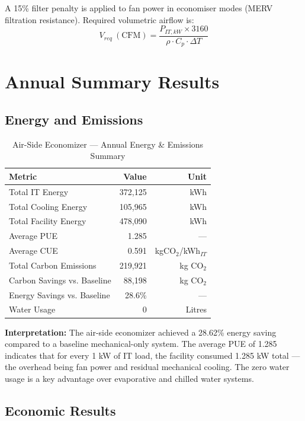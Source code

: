 \documentclass[12pt,a4paper]{report}
\begin{document}
A 15\% filter penalty is applied to fan power in economiser modes (MERV filtration resistance).
Required volumetric airflow is:
\begin{equation}
V_{req}\ (\text{CFM}) = \frac{P_{IT,kW} \times 3160}{\rho \cdot C_p \cdot \Delta T}
\label{eq:air_cfm}
\end{equation}

\section{Annual Summary Results}

\subsection{Energy and Emissions}

\begin{table}[H]
\centering
\caption{Air-Side Economizer --- Annual Energy \& Emissions Summary}
\label{tab:air_annual}
\renewcommand{\arraystretch}{1.3}
\begin{tabular}{lrr}
\toprule
\textbf{Metric} & \textbf{Value} & \textbf{Unit} \\
\midrule
Total IT Energy & 372{,}125 & kWh \\
Total Cooling Energy & 105{,}965 & kWh \\
Total Facility Energy & 478{,}090 & kWh \\
Average PUE & 1.285 & --- \\
Average CUE & 0.591 & kgCO$_2$/kWh$_{IT}$ \\
Total Carbon Emissions & 219{,}921 & kg CO$_2$ \\
Carbon Savings vs. Baseline & 88{,}198 & kg CO$_2$ \\
Energy Savings vs. Baseline & 28.6\% & --- \\
Water Usage & 0 & Litres \\
\bottomrule
\end{tabular}
\end{table}

\noindent\textbf{Interpretation:} The air-side economizer achieved a 28.62\% energy saving compared
to a baseline mechanical-only system. The average PUE of 1.285 indicates that for every 1 kW of IT load,
the facility consumed 1.285 kW total --- the overhead being fan power and residual mechanical cooling.
The zero water usage is a key advantage over evaporative and chilled water systems.

\subsection{Economic Results}
\end{document}
